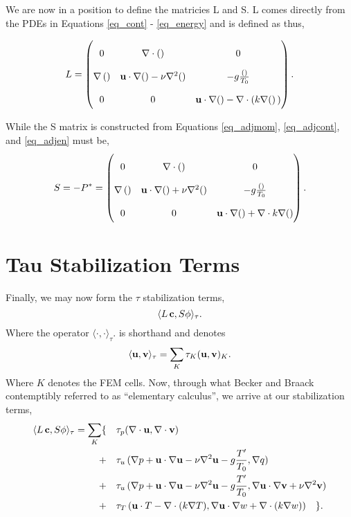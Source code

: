 We are now in a position to define the matricies L and S. L comes
directly from the PDEs in Equations \ref{eq_cont} - \ref{eq_energy} and is
defined as thus, 

\begin{equation}
\renewcommand\arraystretch{2}
 L = 
  \begin{pmatrix}
    0 & \nabla \cdot () & 0   \\
    \nabla \,() & {\bf u} \cdot \nabla() - \nu \nabla^2() & -g \frac{()}{T_0}  \\
    0 & 0 & {\bf u} \cdot \nabla() - \nabla \cdot (k \nabla() \,)
  \end{pmatrix}.
\end{equation}

While the S matrix is constructed from Equations
\ref{eq_adjmom}, \ref{eq_adjcont}, and \ref{eq_adjen} must be, 
\begin{equation}
\renewcommand\arraystretch{2}
 S = -P^* = 
  \begin{pmatrix}
    0 & \nabla \cdot () & 0   \\
    \nabla \,() & {\bf u} \cdot \nabla() + \nu \nabla^2() &  -g \frac{()}{T_0}  \\
    0 & 0 & {\bf u} \cdot \nabla() + \nabla \cdot k \nabla()
  \end{pmatrix}.
\end{equation}

%
%
\section{Tau Stabilization Terms}

Finally, we may now form the $\tau$ stabilization terms, 
\begin{equation}
 \langle L\, {\bf c},S{\bf \phi} \rangle_\tau. 
\end{equation}
Where the operator $ \langle \cdot,\cdot \rangle_\tau. $ is shorthand 
and denotes
\begin{equation}
 \langle {\bf u},{\bf v} \rangle_\tau = \sum_K \tau_K ({\bf u},{\bf v})_K.
\end{equation}
Where $K$ denotes the FEM cells. Now, through what Becker and Braack
contemptibly referred to as ``elementary calculus'', we arrive at our
stabilization terms,  
\begin{align*}
 \langle L\,{\bf c},S{\bf \phi} \rangle_\tau = \sum_K \{ \quad &\tau_p (\nabla \cdot {\bf u},
 \nabla \cdot {\bf v}) \\
 +\quad &\tau_u \,(\nabla p + {\bf u} \cdot \nabla {\bf u} - \nu
 \nabla^2 {\bf u} - g \frac{T'}{T_0},
 \nabla q) \\
 +\quad &\tau_u \, (\nabla p + {\bf u} \cdot \nabla {\bf u} - \nu \nabla^2 {\bf u}- g \frac{T'}{T_0},
 \nabla {\bf u} \cdot \nabla {\bf v} + \nu \nabla^2 {\bf v}) \\
 +\quad &\tau_T \, ({\bf u} \cdot T - \nabla \cdot (k \nabla T), \nabla {\bf u} \cdot \nabla
 w + \nabla \cdot (k \nabla w)) \quad \}.
\end{align*}

